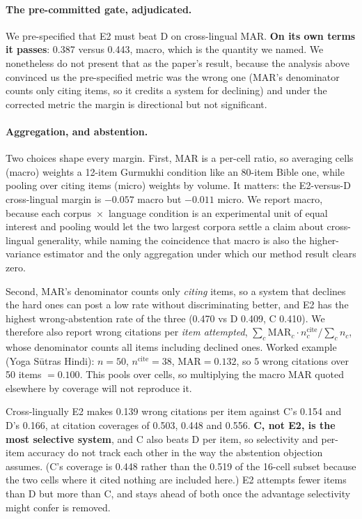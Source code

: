 \documentclass[11pt]{article}
\begin{document}
\paragraph{The pre-committed gate, adjudicated.} We pre-specified that E2 must
beat D on cross-lingual MAR. \textbf{On its own terms it passes}: 0.387 versus
0.443, macro, which is the quantity we named. We nonetheless do not present that
as the paper's result, because the analysis above convinced us the pre-specified
metric was the wrong one (MAR's denominator counts only citing items, so it
credits a system for declining) and under the corrected metric the margin is
directional but not significant.

\paragraph{Aggregation, and abstention.} Two choices shape every margin. First, MAR is a per-cell ratio, so averaging cells (macro) weights a
12-item Gurmukhi condition like an 80-item Bible one, while pooling over citing
items (micro) weights by volume. It matters: the E2-versus-D cross-lingual margin
is $-0.057$ macro but $-0.011$ micro. We report macro, because each
corpus~$\times$~language condition is an experimental unit of equal interest and
pooling would let the two largest corpora settle a claim about cross-lingual
generality, while naming the coincidence that macro is also the
higher-variance estimator and the only aggregation under which our method result
clears zero.

Second, MAR's denominator counts only \emph{citing} items, so a system that
declines the hard ones can post a low rate without discriminating better, and E2
has the highest wrong-abstention rate of the three (0.470 vs D 0.409, C 0.410).
We therefore also report wrong citations per \emph{item attempted},
$\sum_c \text{MAR}_c \cdot n^{\text{cite}}_c / \sum_c n_c$, whose denominator
counts all items including declined ones. Worked example (Yoga S\={u}tras Hindi):
$n=50$, $n^{\text{cite}}=38$, $\text{MAR}=0.132$, so $5$ wrong citations over 50
items $=0.100$. This pools over cells, so multiplying the macro MAR quoted
elsewhere by coverage will not reproduce it.

Cross-lingually E2 makes 0.139 wrong citations per item against C's 0.154 and D's
0.166, at citation coverages of 0.503, 0.448 and 0.556. \textbf{C, not E2, is the most selective system}, and C also beats D per
item, so selectivity and per-item accuracy do not track each other in the way
the abstention objection assumes. (C's coverage is 0.448 rather than the 0.519 of
the 16-cell subset because the two cells where it cited nothing are included
here.) E2 attempts fewer items than D but more than C,
and stays ahead of both once the advantage selectivity might confer is removed.
\end{document}
